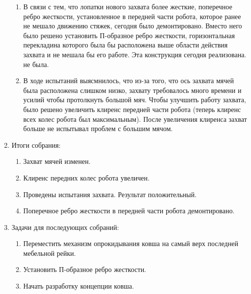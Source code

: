 \begin{enumerate}
\begin{enumerate}
		\item В связи с тем, что лопатки нового захвата более жесткие, поперечное ребро жесткости, установленное в передней части робота, которое ранее не мешало движению стяжек, сегодня было демонтировано. Вместо него было решено установить П-образное ребро жесткости, горизонтальная перекладина которого была бы расположена выше области действия захвата и не мешала бы его работе. Эта конструкция сегодня реализована. не была.
		
		\item В ходе испытаний выясмнилось, что из-за того, что ось захвата мячей была расположена слишком низко, захвату требовалось много времени и усилий чтобы протолкнуть большой мяч. Чтобы улучшить работу захвата, было решено увеличить клиренс передней части робота (теперь клиренс всех колес робота был максимальным). После увеличения клиренса захват больше не испытывал проблем с большим мячом.
		
		
	\end{enumerate}
	
	\item Итоги собрания: 
	\begin{enumerate}
		\item Захват мячей изменен.
		
		\item Клиренс передних колес робота увеличен.
		
		\item Проведены испытания захвата. Результат положительный.
		
		\item Поперечное ребро жесткости в передней части робота демонтировано.
		
	\end{enumerate}
	
	\item Задачи для последующих собраний:
	\begin{enumerate}
		\item Переместить механизм опрокидывания ковша на самый верх последней мебельной рейки.
		
		\item Установить П-образное ребро жесткости.
		
		\item Начать разработку концепции ковша.
		
	\end{enumerate}     
\end{enumerate}
\fillpage